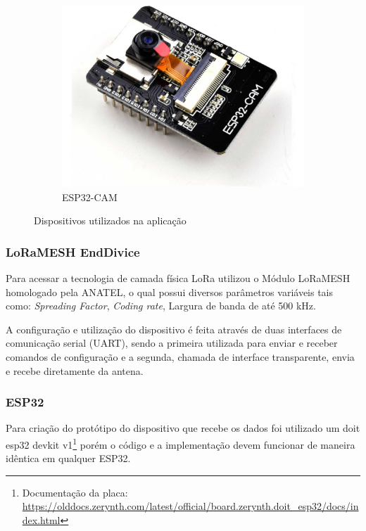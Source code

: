 \documentclass[
article,			%
12pt,				%
oneside,			%
a4paper,			%
english,			%
brazil,				%
sumario=tradicional
]{abntex2}
\begin{document}
\begin{figure}[h!]
\begin{subfigure}[b]{0.3\linewidth}
  \end{subfigure}
  \begin{subfigure}[b]{0.3\linewidth}
    \includegraphics[width=\linewidth]{espcam}
    \caption{ESP32-CAM}
  \end{subfigure}
  \caption{Dispositivos utilizados na aplicação}
  \label{fig:coffee}
\end{figure}

\subsubsection{LoRaMESH EndDivice}\label{LoRaMESH EndDivice}
Para acessar a tecnologia de camada física LoRa utilizou o Módulo LoRaMESH homologado pela ANATEL\cite{lora_radioenge}, o qual possui diversos parâmetros variáveis tais como: \textit{Spreading Factor}, \textit{Coding rate}, Largura de banda de até 500 kHz.

A configuração e utilização do dispositivo é feita através de duas interfaces de comunicação serial (UART), sendo a primeira utilizada para enviar e receber comandos de configuração e a segunda, chamada de interface transparente, envia e recebe diretamente da antena.

\subsubsection{ESP32}\label{ESP32}
Para criação do protótipo do dispositivo que recebe os dados foi utilizado um doit esp32 devkit v1\footnote{Documentação da placa: \url{https://olddocs.zerynth.com/latest/official/board.zerynth.doit_esp32/docs/index.html}} porém o código e a implementação devem funcionar de maneira idêntica em qualquer ESP32.
\end{document}
